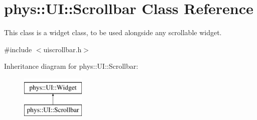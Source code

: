 \hypertarget{classphys_1_1UI_1_1Scrollbar}{
\section{phys::UI::Scrollbar Class Reference}
\label{d0/d3e/classphys_1_1UI_1_1Scrollbar}
}


This class is a widget class, to be used alongside any scrollable widget.  




{\ttfamily \#include $<$uiscrollbar.h$>$}

Inheritance diagram for phys::UI::Scrollbar:\begin{figure}[H]
\begin{center}
\leavevmode
\includegraphics[height=2cm]{d0/d3e/classphys_1_1UI_1_1Scrollbar}
\end{center}
\end{figure}
